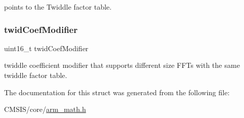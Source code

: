 points to the Twiddle factor table. \mbox{\label{structarm__cfft__radix2__instance__f32_afe772e5b5001c9d8e85032115a8df5bf}} 
\subsubsection{\texorpdfstring{twidCoefModifier}{twidCoefModifier}}
{\footnotesize\ttfamily uint16\+\_\+t twid\+Coef\+Modifier}

twiddle coefficient modifier that supports different size F\+F\+Ts with the same twiddle factor table. 

The documentation for this struct was generated from the following file\+:\begin{DoxyCompactItemize}
\item 
C\+M\+S\+I\+S/core/\mbox{\hyperlink{arm__math_8h}{arm\+\_\+math.\+h}}\end{DoxyCompactItemize}
